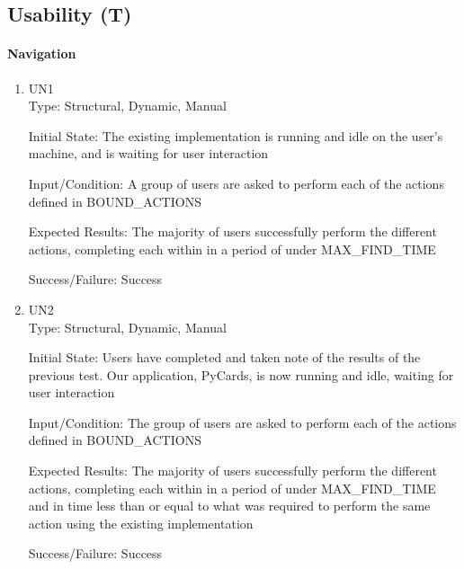 \documentclass[12pt, titlepage]{article}
\newcounter{tnum}
\newcommand{\tthetnum}{T\thetnum}
\begin{document}
	 \label{tUse}
	\subsection{Usability (\tthetnum)}

	\paragraph{Navigation}
	\begin{enumerate}
	\item{UN1\\}
		Type: Structural, Dynamic, Manual
		
		Initial State: The existing implementation is running and idle on the user's
		machine, and is waiting for user interaction
		
		Input/Condition: A group of users are asked to perform each of the actions
		defined in BOUND\_ACTIONS
		
		Expected Results: The majority of users successfully perform the different
		actions, completing each within in a period of under MAX\_FIND\_TIME

		Success/Failure: Success

		\item{UN2\\}
		Type: Structural, Dynamic, Manual
		
		Initial State: Users have completed and taken note of the results of the
		previous test. Our application, PyCards, is now running and idle, waiting for
		user interaction
		
		Input/Condition: The group of users are asked to perform each of the actions
		defined in BOUND\_ACTIONS
		
		Expected Results: The majority of users successfully perform the different
		actions, completing each within in a period of under MAX\_FIND\_TIME and in
		time less than or equal to what was required to perform the same action using
		the existing implementation

		Success/Failure: Success
	\end{enumerate}
\end{document}
